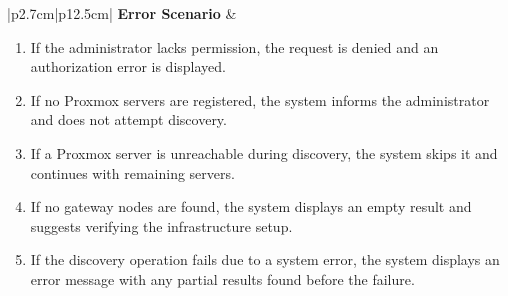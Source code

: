 \begin{table}[H]
\begin{tabular}{|p{2.7cm}|p{12.5cm}|}
\textbf{Error Scenario} & 
\begin{minipage}[t]{\linewidth}
\begin{enumerate}[topsep=0pt,itemsep=1pt,parsep=0pt,partopsep=0pt]
\item If the administrator lacks permission, the request is denied and an authorization error is displayed.
\item If no Proxmox servers are registered, the system informs the administrator and does not attempt discovery.
\item If a Proxmox server is unreachable during discovery, the system skips it and continues with remaining servers.
\item If no gateway nodes are found, the system displays an empty result and suggests verifying the infrastructure setup.
\item If the discovery operation fails due to a system error, the system displays an error message with any partial results found before the failure.
\end{enumerate}
\end{minipage} \\ \hline

\end{tabular}
\label{tab:admin-discover-gateway-nodes}
\end{table}


\iffalse
{}

